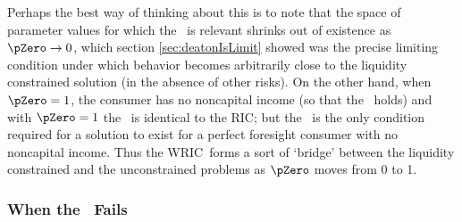 \documentclass[./BufferStockTheory.tex]{subfiles}
\begin{document}
Perhaps the best way of thinking about this is to note that the space
of parameter values for which the \WRIC~is relevant shrinks out of
existence as $\pZero \rightarrow 0$, which section
\ref{sec:deatonIsLimit} showed was the precise limiting condition
under which behavior becomes arbitrarily close to the liquidity
constrained solution (in the absence of other risks).  On the other
hand, when $\pZero = 1$, the consumer has no noncapital income (so
that the \FHWC~holds) and with $\pZero=1$ the \WRIC~is identical to the
RIC; but the \RIC~is
 the only condition required for a solution to exist
for a perfect foresight consumer with no noncapital income.  Thus the
WRIC~forms a sort of `bridge' between the liquidity constrained and
the unconstrained problems as $\pZero$ moves from 0 to 1.

\hypertarget{The-GIC}{}
\hypertarget{When-the-GIC-Fails}{}
\subsubsection{When the \GIC~Fails}
\end{document}
